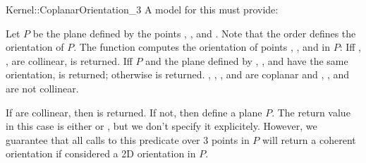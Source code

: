 \begin{ccRefFunctionObjectConcept}{Kernel::CoplanarOrientation_3}
A model for this must provide:


         {Let $P$ be the plane defined by the points , ,
          and . Note that the order defines the orientation of
          $P$. The function computes the orientation of points , 
          , and  in $P$: Iff , ,  are
          collinear,  is returned. Iff $P$ and the plane 
          defined by , , and  have the same orientation, 
           is returned; otherwise  is returned.  
          \ccPrecond {}, , , and  are coplanar and
          , , and  are not collinear.}

{If  are collinear, then  is returned.
If not, then  define a plane $P$.  The return value in this case is
either  or , but we don't specify it explicitely.
However, we guarantee that all calls to this predicate over 3 points in $P$
will return a coherent orientation if considered a 2D orientation in $P$.}


\ccSeeAlso
{}\\

\end{ccRefFunctionObjectConcept}

